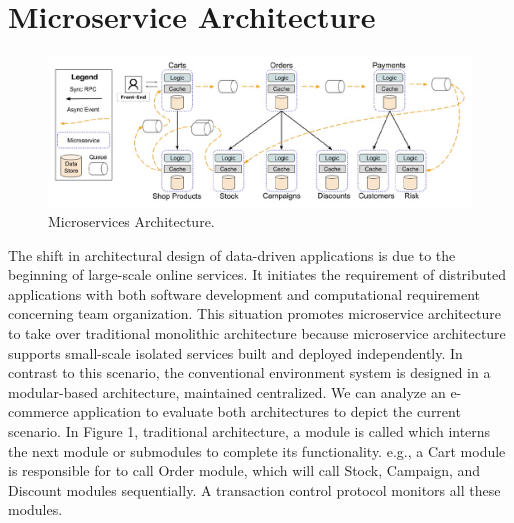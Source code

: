 \documentclass[a4paper,12pt]{article}
\begin{document}
\section*{Microservice Architecture}
\begin{figure}[h!]
	\includegraphics[width=\linewidth]{img/MicroserviceArchitecture.jpg}
	\caption{Microservices Architecture.\cite{one}}
	\label{fig:microarch}
\end{figure}
%
The shift in architectural design of data-driven applications is due to the beginning of large-scale online services. It initiates the requirement of distributed applications with both software development and computational requirement concerning team organization.\cite{two} This situation promotes microservice architecture to take over traditional monolithic architecture because microservice architecture supports small-scale isolated services built and deployed independently. In contrast to this scenario, the conventional environment system is designed in a modular-based architecture, maintained centralized. We can analyze an e-commerce application to evaluate both architectures to depict the current scenario. In Figure 1, traditional architecture, a module is called which interns the next module or submodules to complete its functionality.\cite{cite-40, cite-35} e.g., a Cart module is responsible for to call Order module, which will call Stock, Campaign, and Discount modules sequentially. A transaction control protocol monitors all these modules. \cite{three, four}
 
\end{document}
